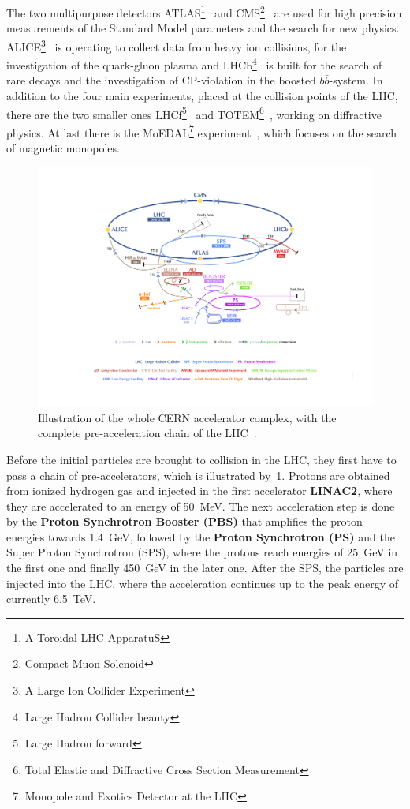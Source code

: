  The two multipurpose detectors ATLAS\footnote{A Toroidal LHC ApparatuS}~\cite{Aad:2008zzm} and CMS\footnote{Compact-Muon-Solenoid}~\cite{Chatrchyan:2008aa} are used for high precision measurements of the Standard Model parameters and the search for new physics. ALICE\footnote{A Large Ion Collider Experiment}~\cite{Aamodt:2008zz} is operating to collect data from heavy ion collisions, for the investigation of the quark-gluon plasma and LHCb\footnote{Large Hadron Collider beauty}~\cite{Alves:2008zz} is built for the search of rare decays and the investigation of CP-violation in the boosted $b\bar{b}$-system. In addition to the four main experiments, placed at the collision points of the LHC, there are the two smaller ones LHCf\footnote{Large Hadron forward}~\cite{Adriani:2008zz} and TOTEM\footnote{Total Elastic and Diffractive Cross Section Measurement}~\cite{Anelli:2008zza}, working on diffractive physics. At last there is the MoEDAL\footnote{Monopole and Exotics Detector at the LHC} experiment~\cite{Pinfold:2009oia}, which focuses on  the search of magnetic monopoles. 
\begin{figure}[h]
	\centering
	\includegraphics[width=1.0\linewidth]{Pics/cp3/32}
	\caption{Illustration of the whole CERN accelerator complex, with the complete pre-acceleration chain of the LHC~\cite{DeMelis:2119882}.} 
	\label{fig:32}
\end{figure}

 Before the initial particles are brought to collision in the LHC, they first have to pass a chain of pre-accelerators, which is illustrated by~\cref{fig:32}. Protons  are obtained from ionized hydrogen gas and injected in the first accelerator \textbf{LINAC2}, where they are accelerated to an energy of 50~MeV. The next acceleration step is done by the \textbf{Proton Synchrotron Booster (PBS)} that amplifies the proton energies towards 1.4~GeV, followed by the \textbf{Proton Synchrotron (PS)} and the {Super Proton Synchrotron (SPS)}, where the protons reach energies of 25~GeV in the first one and finally 450~GeV in the later one. After the SPS, the particles are injected into the {LHC}, where the acceleration continues up to the peak energy of currently 6.5~TeV.

